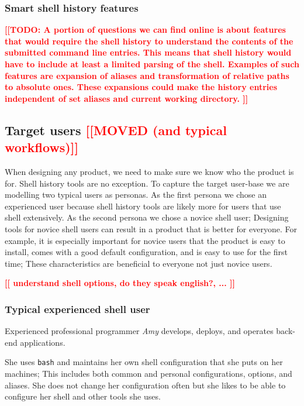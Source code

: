\documentclass[thesis=M,english]{FITthesis}[2012/10/20]
\newcommand{\todotext}[1]{\textcolor{red}{\textbf{[[#1]]}}}
\newcommand{\redtext}[1]{\textcolor{red}{[[#1]]}}
\begin{document}
\subsubsection*{Smart shell history features}

\todotext{TODO: A portion of questions we can find online is about features that would require the shell history to understand the contents of the submitted command line entries. This means that shell history would have to include at least a limited parsing of the shell. Examples of such features are expansion of aliases and transformation of relative paths to absolute ones. These expansions could make the history entries independent of set aliases and current working directory. }


\subsection{Target users \redtext{MOVED (and typical workflows)} }

When designing any product, we need to make sure we know who the product is for. Shell history tools are no exception. To capture the target user-base we are modelling two typical users as personas. As the first persona we chose an experienced user because shell history tools are likely more for users that use shell extensively. As the second persona we chose a novice shell user; Designing tools for novice shell users can result in a product that is better for everyone. For example, it is especially important for novice users that the product is easy to install, comes with a good default configuration, and is easy to use for the first time; These characteristics are beneficial to everyone not just novice users. 

\todotext{ understand shell options, do they speak english?, ... }


\subsubsection*{Typical experienced shell user}

Experienced professional programmer \textit{Amy} develops, deploys, and operates back-end applications.

She uses \verb|bash| and maintains her own shell configuration that she puts on her machines; This includes both common and personal configurations, options, and aliases. She does not change her configuration often but she likes to be able to configure her shell and other tools she uses.
\end{document}
